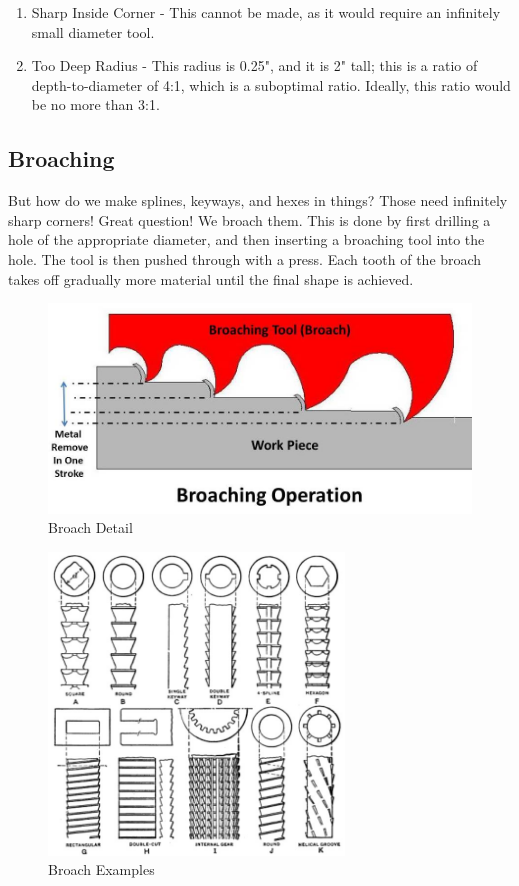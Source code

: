 \documentclass[10pt,letterpaper]{book}
\begin{document}
 \begin{enumerate}[label=\alph*]
 	\item Sharp Inside Corner - This cannot be made, as it would require an infinitely small diameter tool.
 	\item Too Deep Radius - This radius is 0.25", and it is 2" tall; this is a ratio of depth-to-diameter of 4:1, which is a suboptimal ratio. Ideally, this ratio would be no more than 3:1.
 \end{enumerate}
 
 \subsection{Broaching}
 
 But how do we make splines, keyways, and hexes in things? Those need infinitely sharp corners! Great question! We broach them. This is done by first drilling a hole of the appropriate diameter, and then inserting a broaching tool into the hole. The tool is then pushed through with a press. Each tooth of the broach takes off gradually more material until the final shape is achieved.
 
 \begin{figure}[H] \centering
 	\includegraphics[width=\textwidth]{imgs/broach_detail.jpeg}
 	\caption{Broach Detail}
 \end{figure}
 
 \begin{figure}[H] \centering
 	\includegraphics[width=0.7\textwidth]{imgs/broach_examples.jpeg}
 	\caption{Broach Examples}
 \end{figure}
 
\end{document}
